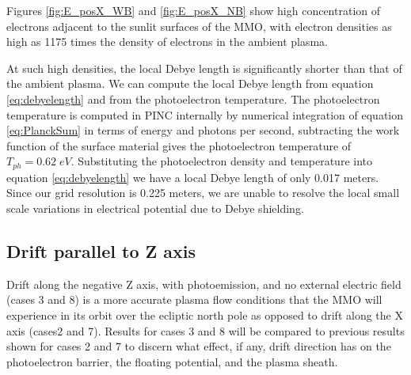 Figures \ref{fig:E_posX_WB} and \ref{fig:E_posX_NB} show high concentration of electrons adjacent to the sunlit surfaces of the MMO, with electron densities as high as 1175 times the density of electrons in the ambient plasma. 

At such high densities, the local Debye length is significantly shorter than that of the ambient plasma. We can compute the local Debye length from equation \eqref{eq:debyelength} and from the photoelectron temperature. The photoelectron temperature is computed in PINC internally by numerical integration of equation \eqref{eq:PlanckSum} in terms of energy and photons per second, subtracting the work function of the surface material gives the photoelectron temperature of $T_{ph} = 0.62 \; eV$. Substituting the photoelectron density and temperature into equation \eqref{eq:debyelength} we have a local Debye length of only 0.017 meters. Since our grid resolution is 0.225 meters, we are unable to resolve the local small scale variations in electrical potential due to Debye shielding.

\subsection*{Drift parallel to Z axis}
Drift along the negative Z axis, with photoemission, and no external electric field (cases 3 and 8) is a more accurate plasma flow conditions that the MMO will experience in its orbit over the ecliptic north pole as opposed to drift along the X axis (cases2 and 7). Results for cases 3 and 8 will be compared to previous results shown for cases  2 and 7 to discern what effect, if any, drift direction has on the photoelectron barrier, the floating potential, and the plasma sheath. 

